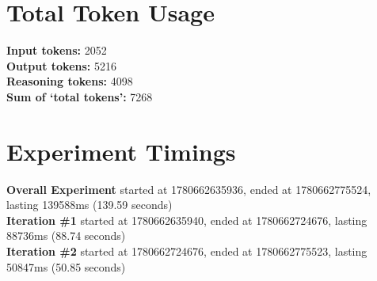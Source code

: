 \documentclass{article}
\begin{document}
\section*{Total Token Usage}
\textbf{Input tokens: }2052
\\\textbf{Output tokens: }5216
\\\textbf{Reasoning tokens: }4098
\\\textbf{Sum of `total tokens': }7268
\section*{Experiment Timings}
\textbf{Overall Experiment} started at 1780662635936, ended at 1780662775524, lasting 139588ms (139.59 seconds)
\\\textbf{Iteration \#1} started at 1780662635940, ended at 1780662724676, lasting 88736ms (88.74 seconds)
\\\textbf{Iteration \#2} started at 1780662724676, ended at 1780662775523, lasting 50847ms (50.85 seconds)
\end{document}
